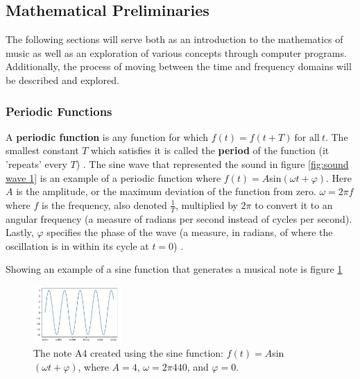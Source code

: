 \documentclass[10pt]{article}
\begin{document}
\subsection{Mathematical Preliminaries}
The following sections will serve both as an introduction to the mathematics of music as well as an exploration of various concepts through computer programs. Additionally, the process of moving between the time and frequency domains will be described and explored.

\subsubsection{Periodic Functions}
\hspace{\parindent} A \textbf{periodic function} is any function for which $f(t) = f(t + T) \: \text{for all} \: t$.
The smallest constant $T$ which satisfies it is called the \textbf{period} of the function (it 'repeats' every $T$) \cite{hsu1970fourier}. The sine wave that represented the sound in figure \ref{fig:sound wave 1} is an example of a periodic function where $f(t)=A$sin$(\omega t+\varphi)$. Here $A$ is the amplitude, or the maximum deviation of the function from zero. $\omega=2\pi f$ where $f$ is the frequency, also denoted $\frac{1}{T}$, multiplied by $2\pi$ to convert it to an angular frequency (a measure of radians per second instead of cycles per second). Lastly, $\varphi$ specifies the phase of the wave (a measure, in radians, of where the oscillation is in within its cycle at $t=0$) \cite{sineWiki} \cite{angularFrequency}.

Showing an example of a sine function that generates a musical note is figure \ref{fig:sine python}

\begin{figure}[h]
    \centering
    \includegraphics[width=0.3\textwidth]{440Apython.jpg}
    \caption{The note A4 created using the sine function: $f(t)=A$sin$(\omega t+\varphi)$, where $A = 4$, $\omega = 2\pi440$, and $\varphi = 0$.} 
    \label{fig:sine python}
\end{figure}
\end{document}
